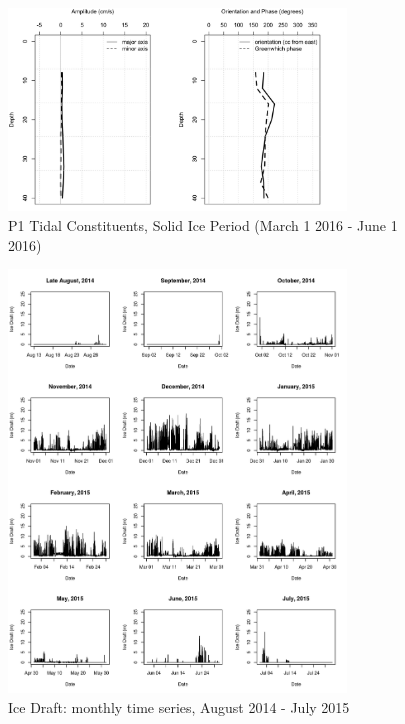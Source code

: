 \documentclass[12pt]{dforeport}
\begin{document}
\begin{figure}  
\centering
\includegraphics[width = 0.8\textwidth]{./figures/62_P1TC_si_2015.png}
\caption[P1 Tidal Constituents, Solid Ice, 2015]{P1 Tidal Constituents, Solid Ice Period (March 1 2016 - June 1 2016)}
\label{f:p1_si_2015}
\end{figure}



\begin{figure}  
\centering
\includegraphics[width = 0.8\textwidth]{./figures/63_iceDraft_2014_2015.png}
\caption[Ice Draft, 2014-2015]{Ice Draft: monthly time series, August 2014 - July 2015}
\label{f:id_2014_2015}
\end{figure}
\end{document}
